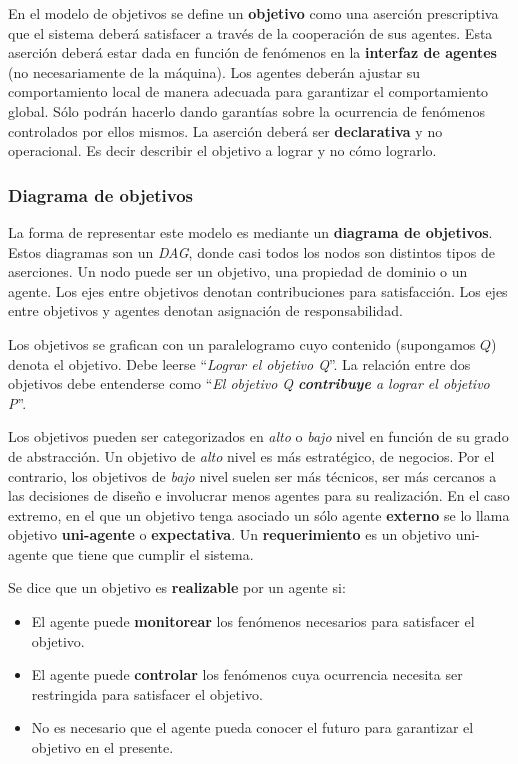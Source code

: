 \documentclass[]{article}
\begin{document}
En el modelo de objetivos se define un \textbf{objetivo} como una aserción prescriptiva que el sistema deberá satisfacer a través de la cooperación de sus agentes. Esta aserción deberá estar dada en función de fenómenos en la \textbf{interfaz de agentes} (no necesariamente de la máquina). Los agentes deberán ajustar su comportamiento local de manera adecuada para garantizar el comportamiento global. Sólo podrán hacerlo dando garantías sobre la ocurrencia de fenómenos controlados por ellos mismos. La aserción deberá ser \textbf{declarativa} y no operacional. Es decir describir el objetivo a lograr y no cómo lograrlo.

\subsubsection{Diagrama de objetivos}
La forma de representar este modelo es mediante un \textbf{diagrama de objetivos}. Estos diagramas son un \textit{DAG}, donde casi todos los nodos son distintos tipos de aserciones. Un nodo puede ser un objetivo, una propiedad de dominio o un agente. Los ejes entre objetivos denotan contribuciones para satisfacción. Los ejes entre objetivos y agentes denotan asignación de responsabilidad.

Los objetivos se grafican con un paralelogramo cuyo contenido (supongamos $Q$) denota el objetivo. Debe leerse ``\textit{Lograr el objetivo Q}''. La relación entre dos objetivos debe entenderse como ``\textit{El objetivo Q \textbf{contribuye} a lograr el objetivo P}''.

Los objetivos pueden ser categorizados en \textit{alto} o \textit{bajo} nivel en función de su grado de abstracción. Un objetivo de \textit{alto} nivel es más estratégico, de negocios. Por el contrario, los objetivos de \textit{bajo} nivel suelen ser más técnicos, ser más cercanos a las decisiones de diseño e involucrar menos agentes para su realización. En el caso extremo, en el que un objetivo tenga asociado un sólo agente \textbf{externo} se lo llama objetivo \textbf{uni-agente} o \textbf{expectativa}. Un \textbf{requerimiento} es un objetivo uni-agente que tiene que cumplir el sistema.

Se dice que un objetivo es \textbf{realizable} por un agente si:
\begin{itemize}
	\item El agente puede \textbf{monitorear} los fenómenos necesarios para satisfacer el objetivo.
	\item El agente puede \textbf{controlar} los fenómenos cuya ocurrencia necesita ser restringida para satisfacer el objetivo.
	\item No es necesario que el agente pueda conocer el futuro para garantizar el objetivo en el presente.
\end{itemize}
\end{document}
